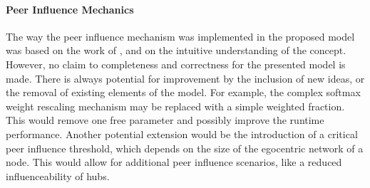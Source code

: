 \paragraph{Peer Influence Mechanics}
The way the peer influence mechanism was implemented in the proposed model was based on the work of \citet{Walk2016}, and on the intuitive understanding of the concept.
However, no claim to completeness and correctness for the presented model is made.
There is always potential for improvement by the inclusion of new ideas, or the removal of existing elements of the model.
For example, the complex softmax weight rescaling mechanism may be replaced with a simple weighted fraction.
This would remove one free parameter and possibly improve the runtime performance.
Another potential extension would be the introduction of a critical peer influence threshold, which depends on the size of the egocentric network of a node.
This would allow for additional peer influence scenarios, like a reduced influenceability of hubs.
